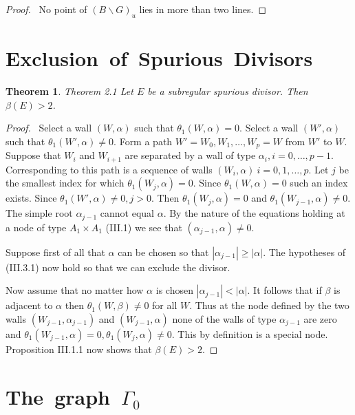 \documentclass{memo-l}
\newtheorem{theorem}{Theorem}[section]
\theoremstyle{definition}
\theoremstyle{remark}
\numberwithin{section}{chapter}
\numberwithin{equation}{chapter}
\begin{document}
\medskip

\begin{proof} \  No point of $(B\backslash G)_{u}$ lies in more than
two lines.
\end{proof}


\section{{Exclusion\ of\ Spurious\ Divisors}}

\begin{theorem}{Theorem 2.1}    Let $E$ be a subregular spurious divisor.
 Then ${\beta}(E) > 2$.
\end{theorem}

\medpagebreak

\begin{proof} \ Select a wall $(W,{\alpha})$ such that
${\theta}_{1}(W,{\alpha}) = 0$.  Select a wall $(W',{\alpha})$ such that
${\theta}_{1}(W',{\alpha})\ne 0$.  Form a path $W' = W_{0},W_{1},\ldots ,
W_{p} = W$ from $W'$ to $W$.  Suppose that $W_{i}$ and $W_{i+1}$ are
separated by a wall of type ${\alpha}_{i}, i = 0,\ldots ,p-1$.  Corresponding
to this path is a sequence of walls $(W_{i},{\alpha})\  i = 0,1,\ldots ,p$.
Let $j$ be the smallest index for which ${\theta}_{1}(W_{j},{\alpha}) = 0$.
Since ${\theta}_{1}(W,{\alpha}) = 0$ such an index exists.  Since
${\theta}_{1}(W',{\alpha})\ne 0, j > 0$.  Then
${\theta}_{1}(W_{j},{\alpha}) = 0$ and ${\theta}_{1}(W_{j-1},{\alpha})\ne 0$.
The simple root ${\alpha}_{j-1}$ cannot equal ${\alpha}$.  By the nature of
the equations holding at a node of type $A_{1} \times A_{1}$ (III.1) we see
that $({\alpha}_{j-1},{\alpha})\ne 0$.

   Suppose first of all that ${\alpha}$ can be chosen so that
   $|\alpha_{j-1}|\ge |\alpha|$.
  The hypotheses
of (III.3.1) now hold so that we can exclude the divisor.

   Now assume that no matter how ${\alpha}$ is chosen $|\alpha_{j-1}|< |\alpha|$.
  It follows that if ${\beta}$
is adjacent to ${\alpha}$ then ${\theta}_{1}(W,{\beta})\ne 0$ for all $W$.
Thus at the node defined by the two walls $(W_{j-1},{\alpha}_{j-1})$ and
$(W_{j-1},{\alpha})$ none of the walls of type ${\alpha}_{j-1}$ are zero
and ${\theta}_{1}(W_{j-1},{\alpha}) = 0, {\theta}_{1}(W_{j},{\alpha})\ne 0$.
This by definition is a special node.  Proposition III.1.1 now shows that
${\beta}(E) > 2$.
\end{proof}

\section{The\ graph\ $\Gamma_0$}
\end{document}
